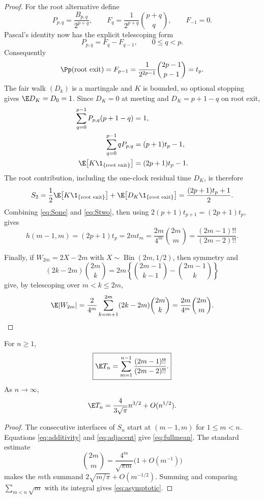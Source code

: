 \begin{proof}
For the root alternative define
\[
 P_{p,q}=\frac{B_{p,q}}{2^{p+q}},\qquad
 F_q=\frac1{2^{p+q}}\binom{p+q}{q},\qquad F_{-1}=0.
\]
Pascal's identity now has the explicit telescoping form
\begin{equation}
 P_{p,q}=F_q-F_{q-1},\qquad 0\leq q<p.                \label{eq:Ptel}
\end{equation}
Consequently
\begin{equation}
 \Pp(\text{root exit})=F_{p-1}
 =\frac1{2^{2p-1}}\binom{2p-1}{p-1}=t_p.              \label{eq:rootprob}
\end{equation}
The fair walk $(D_k)$ is a martingale and $K$ is bounded, so optional
stopping gives $\E D_K=D_0=1$.  Since $D_K=0$ at meeting and
$D_K=p+1-q$ on root exit,
\begin{align}
 \sum_{q=0}^{p-1}P_{p,q}(p+1-q)&=1,\notag\\
 \sum_{q=0}^{p-1}qP_{p,q}&=(p+1)t_p-1,\notag\\
 \E\!\left[K\1_{\{\text{root exit}\}}\right]
   &=(2p+1)t_p-1.                                     \label{eq:rootmoment}
\end{align}
The root contribution, including the one-clock residual time $D_K$, is
therefore
\begin{equation}
 S_2=\frac12\E\!\left[K\1_{\{\text{root exit}\}}\right]
       +\E\!\left[D_K\1_{\{\text{root exit}\}}\right]
    =\frac{(2p+1)t_p+1}{2}.                            \label{eq:Stwo}
\end{equation}
Combining \eqref{eq:Sone} and \eqref{eq:Stwo}, then using
$2(p+1)t_{p+1}=(2p+1)t_p$, gives
\[
 h(m-1,m)=(2p+1)t_p
 =2m t_m
 =\frac{2m}{4^m}\binom{2m}{m}
 =\frac{(2m-1)!!}{(2m-2)!!}.
\]

Finally, if $W_{2m}=2X-2m$ with
$X\sim\operatorname{Bin}(2m,1/2)$, then symmetry and
\[
 (2k-2m)\binom{2m}{k}
 =2m\left\{\binom{2m-1}{k-1}-\binom{2m-1}{k}\right\}
\]
give, by telescoping over $m<k\leq2m$,
\[
 \E|W_{2m}|
 =\frac2{4^m}\sum_{k=m+1}^{2m}
   (2k-2m)\binom{2m}{k}
 =\frac{2m}{4^m}\binom{2m}{m}.
\]
\end{proof}

\begin{theorem}\label{thm:fullmean}
For $n\geq1$,
\begin{equation}
 \boxed{\displaystyle
 \E T_n=\sum_{m=1}^{n-1}
 \frac{(2m-1)!!}{(2m-2)!!}.}                           \label{eq:fullmean}
\end{equation}
As $n\to\infty$,
\begin{equation}
 \E T_n=\frac{4}{3\sqrt\pi}n^{3/2}+O(n^{1/2}).        \label{eq:asymptotic}
\end{equation}
\end{theorem}

\begin{proof}
The consecutive interfaces of $S_n$ start at $(m-1,m)$ for
$1\leq m<n$.  Equations \eqref{eq:additivity} and \eqref{eq:adjacent} give
\eqref{eq:fullmean}.  The standard estimate
\[
 \binom{2m}{m}=\frac{4^m}{\sqrt{\pi m}}
 \bigl(1+O(m^{-1})\bigr)
\]
makes the $m$th summand
$2\sqrt{m/\pi}+O(m^{-1/2})$.  Summing and comparing
$\sum_{m<n}\sqrt m$ with its integral gives \eqref{eq:asymptotic}.
\end{proof}
